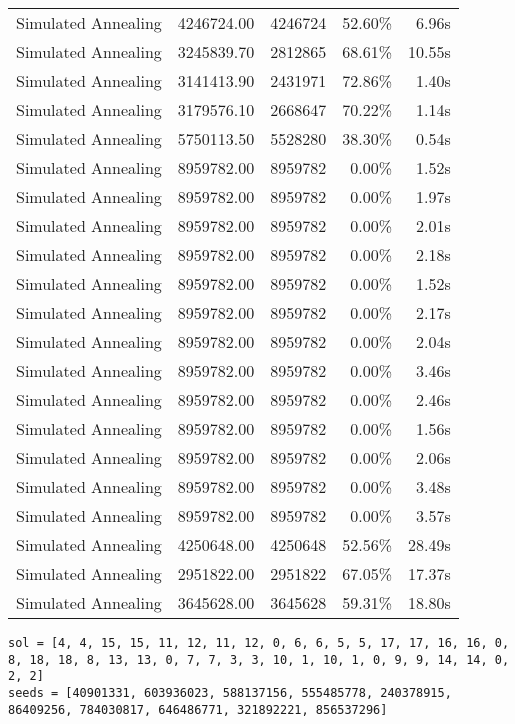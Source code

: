 \begin{table}[ht]
\begin{tabular}{|r|r|r|r|r|}
Simulated Annealing & 4246724.00 & 4246724 & 52.60\% & 6.96s\\
Simulated Annealing & 3245839.70 & 2812865 & 68.61\% & 10.55s\\
Simulated Annealing & 3141413.90 & 2431971 & 72.86\% & 1.40s\\
Simulated Annealing & 3179576.10 & 2668647 & 70.22\% & 1.14s\\
Simulated Annealing & 5750113.50 & 5528280 & 38.30\% & 0.54s\\
Simulated Annealing & 8959782.00 & 8959782 & 0.00\% & 1.52s\\
Simulated Annealing & 8959782.00 & 8959782 & 0.00\% & 1.97s\\
Simulated Annealing & 8959782.00 & 8959782 & 0.00\% & 2.01s\\
Simulated Annealing & 8959782.00 & 8959782 & 0.00\% & 2.18s\\
Simulated Annealing & 8959782.00 & 8959782 & 0.00\% & 1.52s\\
Simulated Annealing & 8959782.00 & 8959782 & 0.00\% & 2.17s\\
Simulated Annealing & 8959782.00 & 8959782 & 0.00\% & 2.04s\\
Simulated Annealing & 8959782.00 & 8959782 & 0.00\% & 3.46s\\
Simulated Annealing & 8959782.00 & 8959782 & 0.00\% & 2.46s\\
Simulated Annealing & 8959782.00 & 8959782 & 0.00\% & 1.56s\\
Simulated Annealing & 8959782.00 & 8959782 & 0.00\% & 2.06s\\
Simulated Annealing & 8959782.00 & 8959782 & 0.00\% & 3.48s\\
Simulated Annealing & 8959782.00 & 8959782 & 0.00\% & 3.57s\\
Simulated Annealing & 4250648.00 & 4250648 & 52.56\% & 28.49s\\
Simulated Annealing & 2951822.00 & 2951822 & 67.05\% & 17.37s\\
Simulated Annealing & 3645628.00 & 3645628 & 59.31\% & 18.80s\\
\end{tabular}%
\end{table}
\begin{lstlisting}[label={lst:call18vehicle5},caption=Optimal solution call\_18\_vehicle\_5]
sol = [4, 4, 15, 15, 11, 12, 11, 12, 0, 6, 6, 5, 5, 17, 17, 16, 16, 0, 8, 18, 18, 8, 13, 13, 0, 7, 7, 3, 3, 10, 1, 10, 1, 0, 9, 9, 14, 14, 0, 2, 2]
seeds = [40901331, 603936023, 588137156, 555485778, 240378915, 86409256, 784030817, 646486771, 321892221, 856537296]
\end{lstlisting}%
\clearpage


